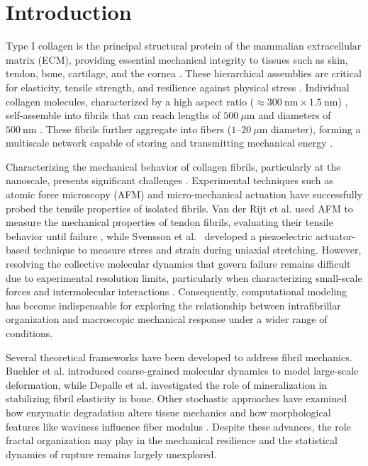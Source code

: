 \documentclass[aps,physrev,preprint,groupedaddress,linenumbers]{revtex4-2}
\begin{document}
\section{Introduction}

Type I collagen is the principal structural protein of the mammalian extracellular matrix (ECM), providing essential mechanical integrity to tissues such as skin, tendon, bone, cartilage, and the cornea \cite{Silver2018,DavisonKotler2019,Tresoldi2013,Fedarko2014, RicoLlanos2021,Chen2015,Suki2021}. These hierarchical assemblies are critical for elasticity, tensile strength, and resilience against physical stress \cite{Silver2018,Amirrah2022}. Individual collagen molecules, characterized by a high aspect ratio ($\approx 300~\text{nm} \times 1.5~\text{nm}$) \cite{Gelse2003, Silver2018}, self-assemble into fibrils that can reach lengths of $500~\mu\text{m}$ and diameters of $500~\text{nm}$ \cite{Charvolin2019,Kadler1996, Parry1984}. These fibrils further aggregate into fibers ($1$--$20~\mu\text{m}$ diameter), forming a multiscale network capable of storing and transmitting mechanical energy \cite{Silver2008,Suki2021}.

Characterizing the mechanical behavior of collagen fibrils, particularly at the nanoscale, presents significant challenges \cite{Nalbach2022}. Experimental techniques such as atomic force microscopy (AFM) and micro-mechanical actuation have successfully probed the tensile properties of isolated fibrils. Van der Rijt et al. used AFM to measure the mechanical properties of tendon fibrils, evaluating their tensile behavior until failure \cite{vanderRijt2006}, while Svensson et al.~\cite{Svensson2018} developed a piezoelectric actuator-based technique to measure stress and strain during uniaxial stretching. However, resolving the collective molecular dynamics that govern failure remains difficult due to experimental resolution limits, particularly when characterizing small-scale forces and intermolecular interactions \cite{Andriotis2023}. Consequently, computational modeling has become indispensable for exploring the relationship between intrafibrillar organization and macroscopic mechanical response under a wider range of conditions.

Several theoretical frameworks have been developed to address fibril mechanics. Buehler et al. introduced coarse-grained molecular dynamics to model large-scale deformation, while Depalle et al. investigated the role of mineralization in stabilizing fibril elasticity in bone\cite{Buehler2006a,Buehler2006b,Buehler2008a,Buehler2008b,Depalle2016}. Other stochastic approaches have examined how enzymatic degradation alters tissue mechanics \cite{Arau2011} and how morphological features like waviness influence fiber modulus \cite{Deng2024}. Despite these advances, the role fractal organization may play in the mechanical resilience and the statistical dynamics of rupture remains largely unexplored.
\end{document}
